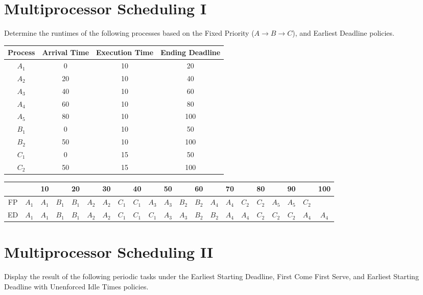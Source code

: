 \documentclass{article}
\begin{document}
\section{Multiprocessor Scheduling I}
Determine the runtimes of the following processes based on the Fixed Priority
($A\to B \to C$), and Earliest Deadline policies.

\vspace{0.5cm}
\begin{center}
\begin{tabular}{|c|c|c|c|}
\hline
Process & Arrival Time & Execution Time & Ending Deadline\\
\hline
$A_{1}$ & 0 & 10 & 20\\
$A_{2}$ & 20 & 10 & 40\\
$A_{3}$ & 40 & 10 & 60\\
$A_{4}$ & 60 & 10 & 80\\
$A_{5}$ & 80 & 10 & 100\\
\hline
$B_{1}$ & 0 & 10 & 50\\
$B_{2}$ & 50 & 10 & 100\\
\hline
$C_{1}$ & 0 & 15 & 50\\
$C_{2}$ & 50 & 15 & 100\\
\hline
\end{tabular}

\vspace{0.5cm}
\begin{tabular}{c|c:c:c:c:c:c:c:c:c:c:c:c:c:c:c:c:c:c:c:c:}
&  & 10 & & 20 & & 30 & & 40 & & 50 & & 60 & & 70 & & 80 & & 90 & & 100\\
\hline
FP & $A_{1}$ & $A_{1}$ & $B_{1}$ & $B_{1}$ & $A_{2}$ & $A_{2}$ & $C_{1}$ & $C_{1}$ & $A_{3}$ & $A_{3}$ & $B_{2}$ & $B_{2}$ & $A_{4}$ & $A_{4}$ & $C_{2}$ & $C_{2}$ & $A_{5}$ & $A_{5}$ & $C_{2}$ & \\
\hline
ED & $A_{1}$ & $A_{1}$ & $B_{1}$ & $B_{1}$ & $A_{2}$ & $A_{2}$ & $C_{1}$ & $C_{1}$ & $C_{1}$ & $A_{3}$ & $A_{3}$ & $B_{2}$ & $B_{2}$ & $A_{4}$ & $A_{4}$ & $C_{2}$ & $C_{2}$ & $C_{2}$ & $A_{4}$ & $A_{4}$\\
\hline
\end{tabular}
\end{center}
\newpage



\section{Multiprocessor Scheduling II}
Display the result of the following periodic tasks under the Earliest Starting Deadline,
First Come First Serve, and Earliest Starting Deadline with Unenforced Idle Times policies.
\end{document}
